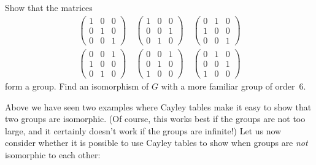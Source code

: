 \begin{exercise}\label{exercise:isomorph:iso_prac4}
Show that the matrices
\begin{gather*}
\begin{pmatrix}
1 & 0 & 0 \\
0 & 1 & 0 \\
0 & 0 & 1
\end{pmatrix}
\quad
\begin{pmatrix}
1 & 0 & 0 \\
0 & 0 & 1 \\
0 & 1 & 0
\end{pmatrix}
\quad
\begin{pmatrix}
0 & 1 & 0 \\
1 & 0 & 0 \\
0 & 0 & 1
\end{pmatrix} \\
\begin{pmatrix}
0 & 0 & 1 \\
1 & 0 & 0 \\
0 & 1 & 0
\end{pmatrix}
\quad
\begin{pmatrix}
0 & 0 & 1 \\
0 & 1 & 0 \\
1 & 0 & 0
\end{pmatrix}
\quad
\begin{pmatrix}
0 & 1 & 0 \\
0 & 0 & 1 \\
1 & 0 & 0
\end{pmatrix}
\end{gather*}
form a group. Find an isomorphism of $G$ with a more familiar group of
order~6.
\end{exercise} 

Above we have seen two examples where  Cayley tables make it easy to show that two groups are isomorphic. (Of course, this works best if the groups are not too large, and it certainly doesn't work if the groups are infinite!)  Let us now consider whether it is possible to use Cayley tables to show when groups are \emph{not} isomorphic to each other: 

